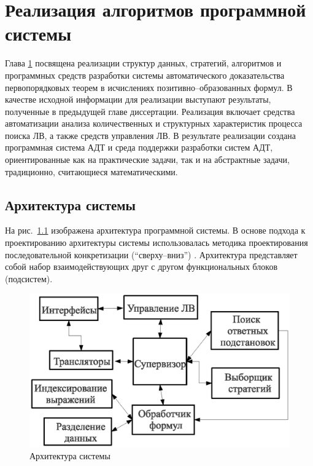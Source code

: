 \chapter{Реализация алгоритмов программной системы}\label{part:three}

Глава \ref{part:three} посвящена реализации структур данных, стратегий, алгоритмов и программных средств разработки системы автоматического доказательства первопорядковых теорем в исчислениях позитивно--образованных формул. В качестве исходной информации для реализации выступают результаты, полученные в предыдущей главе диссертации. Реализация включает средства автоматизации анализа количественных и структурных характеристик процесса поиска ЛВ, а также средств управления ЛВ. В результате реализации создана программная система АДТ и среда поддержки разработки систем АДТ, ориентированные как на практические задачи, так и на абстрактные задачи, традиционно, считающиеся математическими.



\section{Архитектура системы}
На рис.~\ref{fig:design1} изображена архитектура программной системы. В основе подхода к проектированию архитектуры системы использовалась методика проектирования последовательной конкретизации (``сверху--вниз'') \cite{yodan}. Архитектура представляет собой набор взаимодействующих друг с другом функциональных блоков (подсистем).
\begin{figure}[h]
	\centering
	\includegraphics[width=0.6\linewidth]{pics/Design1.eps}
	\caption{Архитектура системы}
	\label{fig:design1}
\end{figure}


